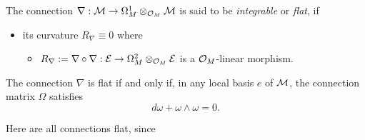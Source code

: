 \begin{defn}
  The connection $\nabla:\mathcal{M}\to \Omega_M^1\otimes_{\mathcal{O}_M}\mathcal{M}$ is said to be
  \emph{integrable} or \emph{flat}, if
  \begin{itemize}
    \item its curvature $R_\nabla\equiv0$
    where
    \begin{itemize}
      \item $R_\nabla:=\nabla\circ\nabla:\mathcal{E}\to\Omega_M^2\otimes_{\mathcal{O}_M}\mathcal{E}$
        is a $\mathcal{O}_M$-linear morphism.
    \end{itemize}
  \end{itemize}
  \begin{s-prop}
    The connection $\nabla$ is flat if and only if, in any local basis $e$ of
    $\mathcal{M}$, the connection matrix $\Omega$ satisfies
    \[
      d\omega + \omega \wedge \omega = 0.
    \]
    \begin{comment}
      This condition is sufficient to assure the existence of local
      fundamental solutions.
    \end{comment}
  \end{s-prop}
  \begin{s-rem}
    Here are all connections flat, since \TODO[dim $1$?]
  \end{s-rem}
  \begin{comment}
    We will say that a connection on a meromorphic bundle is \emph{integrable}
    or \emph{flat} if its restriction to $M\backslash Z$ is an integrable
    connection on the holomorphic bundle $\sM_{|M\backslash Z}$.
  \end{comment}
\end{defn}

